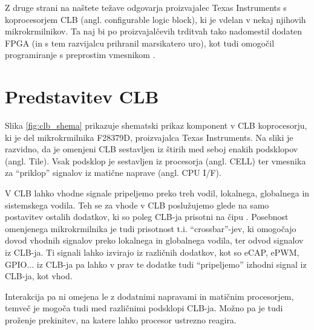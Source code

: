 \documentclass[a4paper]{article}
\begin{document}
\begin{sloppypar}
Z druge strani na naštete težave odgovarja proizvajalec Texas Instruments s koprocesorjem
CLB (angl. configurable logic block), ki je vdelan v nekaj njihovih
mikrokrmilnikov. Ta naj bi po proizvajalčevih trditvah tako nadomestil dodaten
FPGA (in s tem razvijalcu prihranil marsikatero uro), kot tudi omogočil
programiranje s preprostim vmesnikom \cite{clb-intro}.


\section{Predstavitev CLB}\label{sec:predstavitev}
Slika \ref{fig:clb_shema} prikazuje shematski prikaz komponent v CLB
koprocesorju, ki je del mikrokrmilnika F28379D, proizvajalca Texas Instruments.
Na sliki je razvidno, da je omenjeni CLB sestavljen iz štirih med seboj enakih
podsklopov (angl. Tile). Vsak podsklop je sestavljen iz procesorja (angl. CELL)
ter vmesnika za ``priklop'' signalov iz matične naprave (angl. CPU I/F).


V CLB lahko vhodne signale pripeljemo preko treh vodil, lokalnega, globalnega
in sistemskega vodila. Teh se za vhode v CLB poslužujemo glede na samo
postavitev ostalih dodatkov, ki so poleg CLB-ja prisotni na čipu
\cite[Pogl.~26.3]{mcu-ref-manual}. Posebnost omenjenega mikrokrmilnika je tudi
prisotnost t.i. ``crossbar''-jev, ki omogočajo dovod vhodnih signalov preko
lokalnega in globalnega vodila, ter odvod signalov iz CLB-ja. Ti signali lahko
izvirajo iz različnih dodatkov, kot so eCAP, ePWM, GPIO... iz CLB-ja pa lahko v
prav te dodatke tudi ``pripeljemo'' izhodni signal iz CLB-ja, kot vhod.

Interakcija pa ni omejena le z dodatnimi napravami in matičnim procesorjem,
temveč je mogoča tudi med različnimi podsklopi CLB-ja. Možno pa je tudi
proženje prekinitev, na katere lahko procesor ustrezno reagira.


\end{sloppypar}
\end{document}
